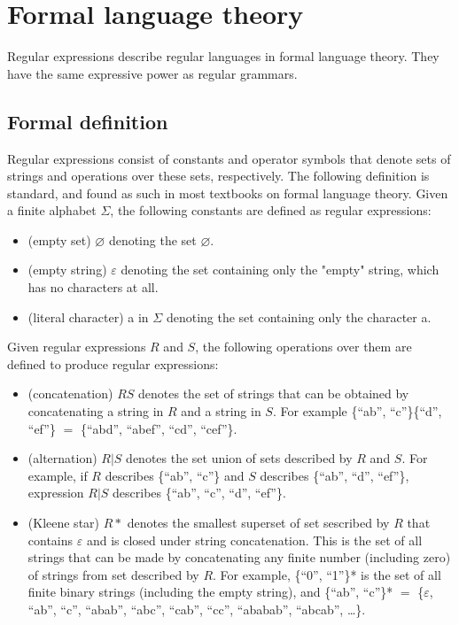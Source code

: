 \chapter{Formal language theory}
\label{chap:formal_lang_theory}

Regular expressions describe regular languages in formal language
theory. They have the same expressive power as regular grammars.

\section{Formal definition}
Regular expressions consist of constants and operator symbols that
denote sets of strings and operations over these sets,
respectively. The following definition is standard, and found as such
in most textbooks on formal language theory. Given a finite alphabet
$\Sigma$, the following constants are defined as regular expressions:
\begin{itemize}
\item (empty set) $\varnothing$ denoting the set $\varnothing$.
\item (empty string) $\varepsilon$ denoting the set containing only
  the "empty" string, which has no characters at all.
\item (literal character) a in $\Sigma$ denoting the set containing
  only the character a.
\end{itemize}
Given regular expressions $R$ and $S$, the following operations over them
are defined to produce regular expressions:
\begin{itemize}
\item (concatenation) $RS$ denotes the set of strings that can be
  obtained by concatenating a string in $R$ and a string in $S$. For
  example \{``ab'', ``c''\}\{``d'', ``ef''\} $=$ \{``abd'', ``abef'',
  ``cd'', ``cef''\}.
\item (alternation) $R | S$ denotes the set union of sets described by
  $R$ and $S$. For example, if $R$ describes \{``ab'', ``c''\} and $S$
  describes \{``ab'', ``d'', ``ef''\}, expression $R | S$ describes
  \{``ab'', ``c'', ``d'', ``ef''\}.
\item (Kleene star) $R*$ denotes the smallest superset of set
  sescribed by $R$ that contains $\varepsilon$ and is closed under
  string concatenation. This is the set of all strings that can be
  made by concatenating any finite number (including zero) of strings
  from set described by $R$. For example, \{``0'', ``1''\}* is the set
  of all finite binary strings (including the empty string), and
  \{``ab'', ``c''\}* $=$ \{$\varepsilon$, ``ab'', ``c'', ``abab'',
  ``abc'', ``cab'', ``cc'', ``ababab'', ``abcab'', \ldots\}.
\end{itemize}

